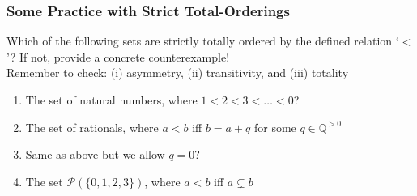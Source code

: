 \begin{frame}
\begin{itemize}[<+->]


\end{itemize}
\end{frame}

\begin{frame}
\frametitle{Some Practice with Strict Total-Orderings}


Which of the following sets are strictly totally ordered by the defined relation `$<$'? If not, provide a concrete counterexample! \\

Remember to check: (i) asymmetry, (ii) transitivity, and (iii) totality

\begin{enumerate}[<+->]

\item The set of natural numbers, where $1 < 2 <3 < \dots < 0$?

\item The set of rationals, where $a < b$ iff $b = a + q$ for some $q \in \mathbb{Q}^{>0}$

\item Same as above but we allow $q=0$? 

\item The set $\mathcal{P}(\{ 0, 1, 2, 3 \})$, where $a < b$ iff $a \subsetneq b$


\end{enumerate}
\end{frame}
